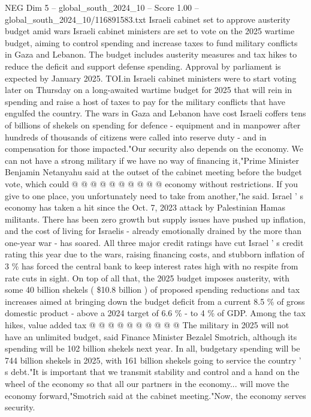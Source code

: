 \begin{textsample}{NEG Dim 5 – global\_south\_2024\_10 – Score 1.00 – global\_south\_2024\_10/116891583.txt}  \label{ex:f5_neg_104}
Israeli cabinet set to approve austerity budget amid wars Israeli cabinet ministers are set to vote on the 2025 wartime budget, aiming to control spending and increase taxes to fund military conflicts in Gaza and Lebanon.
The budget includes austerity measures and tax hikes to reduce the deficit and support defense spending.
Approval by parliament is expected by January 2025.
TOI.in Israeli cabinet ministers were to start voting later on Thursday on a long-awaited wartime budget for 2025 that will rein in spending and raise a host of taxes to pay for the military conflicts that have engulfed the country.
The wars in Gaza and Lebanon have cost Israeli coffers tens of billions of shekels on spending for defence - equipment and in manpower after hundreds of thousands of citizens were called into reserve duty - and in compensation for those impacted."Our security also depends on the economy.
We can not have a strong military if we have no way of financing it,"Prime Minister Benjamin Netanyahu said at the outset of the cabinet meeting before the budget vote, which could @ @ @ @ @ @ @ @ @ @ economy without restrictions.
If you give to one place, you unfortunately need to take from another,"he said.
Israel ' s economy has taken a hit since the Oct. 7, 2023 attack by Palestinian Hamas militants.
There has been zero growth but supply issues have pushed up inflation, and the cost of living for Israelis - already emotionally drained by the more than one-year war - has soared.
All three major credit ratings have cut Israel ' s credit rating this year due to the wars, raising financing costs, and stubborn inflation of 3 \% has forced the central bank to keep interest rates high with no respite from rate cuts in sight.
On top of all that, the 2025 budget imposes austerity, with some 40 billion shekels ( \$10.8 billion ) of proposed spending reductions and tax increases aimed at bringing down the budget deficit from a current 8.5 \% of gross domestic product - above a 2024 target of 6.6 \% - to 4 \% of GDP.
Among the tax hikes, value added tax @ @ @ @ @ @ @ @ @ @ The military in 2025 will not have an unlimited budget, said Finance Minister Bezalel Smotrich, although its spending will be 102 billion shekels next year.
In all, budgetary spending will be 744 billion shekels in 2025, with 161 billion shekels going to service the country ' s debt."It is important that we transmit stability and control and a hand on the wheel of the economy so that all our partners in the economy... will move the economy forward,"Smotrich said at the cabinet meeting."Now, the economy serves security.

\end{textsample}
